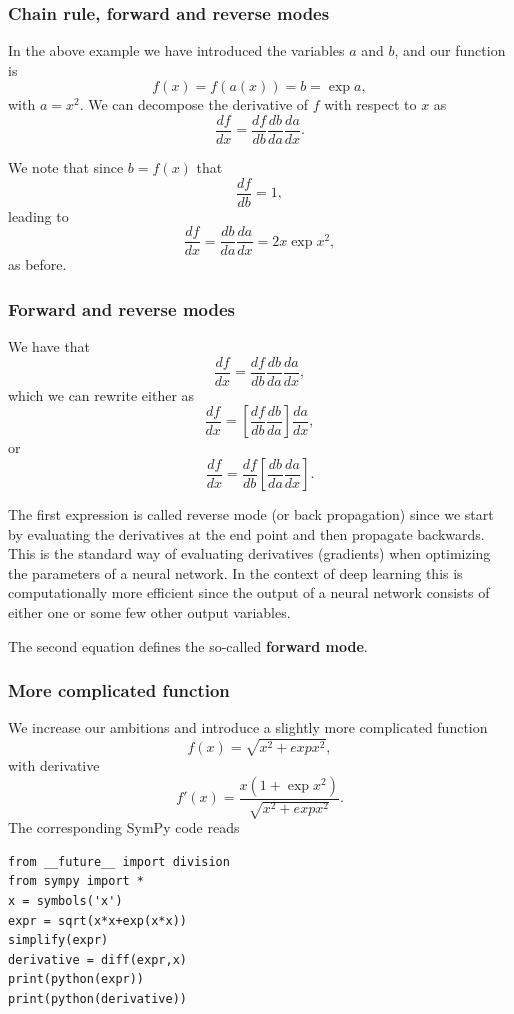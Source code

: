 \documentclass{beamer}
\begin{document}
\begin{frame}
\frametitle{Chain rule, forward and reverse modes}

In the above example we have introduced the variables $a$ and $b$, and our function is
\[
f(x) = f(a(x)) = b= \exp{a},
\]
with $a=x^2$. We can decompose the derivative of $f$ with respect to $x$ as
\[
\frac{df}{dx}=\frac{df}{db}\frac{db}{da}\frac{da}{dx}.
\]

We note that since $b=f(x)$ that
\[
\frac{df}{db}=1,
\]
leading to
\[
\frac{df}{dx}=\frac{db}{da}\frac{da}{dx}=2x\exp{x^2},
\]
as before.
\end{frame}

\begin{frame}
\frametitle{Forward and reverse modes}

We have that 
\[
\frac{df}{dx}=\frac{df}{db}\frac{db}{da}\frac{da}{dx},
\]
which we can rewrite either as
\[
\frac{df}{dx}=\left[\frac{df}{db}\frac{db}{da}\right]\frac{da}{dx},
\]
or
\[
\frac{df}{dx}=\frac{df}{db}\left[\frac{db}{da}\frac{da}{dx}\right].
\]

The first expression is called reverse mode (or back propagation)
since we start by evaluating the derivatives at the end point and then
propagate backwards. This is the standard way of evaluating
derivatives (gradients) when optimizing the parameters of a neural
network.  In the context of deep learning this is computationally
more efficient since the output of a neural network consists of either
one or some few other output variables.

The second equation defines the so-called  \textbf{forward mode}.
\end{frame}

\begin{frame}
\frametitle{More complicated function}

We increase our ambitions and introduce a slightly more complicated function
\[
f(x) =\sqrt{x^2+exp{x^2}},
\]
with derivative
\[
f'(x) =\frac{x(1+\exp{x^2})}{\sqrt{x^2+exp{x^2}}}.
\]
The corresponding SymPy code reads









\begin{verbatim}
from __future__ import division
from sympy import *
x = symbols('x')
expr = sqrt(x*x+exp(x*x))
simplify(expr)
derivative = diff(expr,x)
print(python(expr))
print(python(derivative))

\end{verbatim}
\end{frame}
\end{document}
